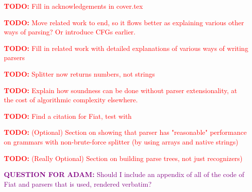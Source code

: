 \newcommand{\todo}[1]{\textcolor{red}{\textbf{TODO:} #1}}
\newcommand{\todoask}[1]{\textcolor{purple}{\textbf{QUESTION FOR ADAM:} #1}}

\todo{Fill in acknowledgements in cover.tex}

\todo{Move related work to end, so it flows better as explaining various other ways of parsing?  Or introduce CFGs earlier.}

\todo{Fill in related work with detailed explanations of various ways of writing parsers}

\todo{Splitter now returns numbers, not strings}

\todo{Explain how soundness can be done without parser extensionality, at the cost of algorithmic complexity elsewhere.}

\todo{Find a citation for Fiat, test with~\cite{fiat}}

\todo{(Optional) Section on showing that parser has "reasonable" performance on grammars with non-brute-force splitter (by using arrays and native strings)}

\todo{(Really Optional) Section on building parse trees, not just recognizers)}

\todoask{Should I include an appendix of all of the code of Fiat and parsers that is used, rendered verbatim?}

\cleardoublepage
{}